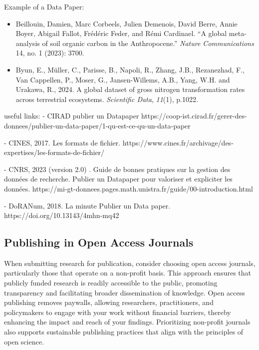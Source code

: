 \documentclass[
]{book}
\newenvironment{Shaded}{\begin{snugshade}}{\end{snugshade}}
\newcommand{\NormalTok}[1]{#1}
\begin{document}
Example of a Data Paper:

\begin{itemize}
\item
  Beillouin, Damien, Marc Corbeels, Julien Demenois, David Berre, Annie Boyer, Abigail Fallot, Frédéric Feder, and Rémi Cardinael.
  ``A global meta-analysis of soil organic carbon in the Anthropocene.'' \emph{Nature Communications} 14, no. 1 (2023): 3700.
\item
  Byun, E., Müller, C., Parisse, B., Napoli, R., Zhang, J.B., Rezanezhad, F., Van Cappellen, P., Moser, G., Jansen-Willems, A.B., Yang, W.H.
  and Urakawa, R., 2024.
  A global dataset of gross nitrogen transformation rates across terrestrial ecosystems.
  \emph{Scientific Data}, \emph{11}(1), p.1022.
\end{itemize}

\begin{Shaded}
\begin{Highlighting}[]
\NormalTok{useful links: }
\NormalTok{{-}   CIRAD publier un Datapaper https://coop{-}ist.cirad.fr/gerer{-}des{-}donnees/publier{-}un{-}data{-}paper/1{-}qu{-}est{-}ce{-}qu{-}un{-}data{-}paper }

\NormalTok{{-}   CINES, 2017. Les formats de fichier. https://www.cines.fr/archivage/des{-}expertises/les{-}formats{-}de{-}fichier/}

\NormalTok{{-}   CNRS, 2023 (version 2.0) . Guide de bonnes pratiques sur la gestion des données de recherche. Publier un Datapaper pour valoriser et expliciter les données. https://mi{-}gt{-}donnees.pages.math.unistra.fr/guide/00{-}introduction.html}

\NormalTok{{-}   DoRANum, 2018. La minute Publier un Data paper. https://doi.org/10.13143/4mhn{-}mq42}
\end{Highlighting}
\end{Shaded}

\subsection{Publishing in Open Access Journals}\label{publishing-in-open-access-journals}

When submitting research for publication, consider choosing open access journals, particularly those that operate on a non-profit basis.
This approach ensures that publicly funded research is readily accessible to the public, promoting transparency and facilitating broader dissemination of knowledge.
Open access publishing removes paywalls, allowing researchers, practitioners, and policymakers to engage with your work without financial barriers, thereby enhancing the impact and reach of your findings.
Prioritizing non-profit journals also supports sustainable publishing practices that align with the principles of open science.
\end{document}
